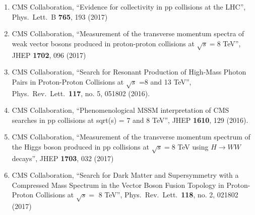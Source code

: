\begin{itemize}
\begin{enumerate}
\item CMS Collaboration, ``Evidence for collectivity in pp collisions at the LHC'', Phys.\ Lett.\ B {\bf 765}, 193 (2017)

\item CMS Collaboration, ``Measurement of the transverse momentum spectra of weak vector bosons produced in proton-proton collisions at $ \sqrt{s}=8 $ TeV'', JHEP {\bf 1702}, 096 (2017)

\item CMS Collaboration, ``Search for Resonant Production of High-Mass Photon Pairs in Proton-Proton Collisions at $\sqrt s$ =8 and 13 TeV'', Phys.\ Rev.\ Lett.\  {\bf 117}, no. 5, 051802 (2016).

\item CMS Collaboration, ``Phenomenological MSSM interpretation of CMS searches in pp collisions at sqrt(s) = 7 and 8 TeV'', JHEP {\bf 1610}, 129 (2016).

\item CMS Collaboration, ``Measurement of the transverse momentum spectrum of the Higgs boson produced in pp collisions at $ \sqrt{s}=8 $ TeV using $H \to WW$ decays'', JHEP {\bf 1703}, 032 (2017)

\item CMS Collaboration, ``Search for Dark Matter and Supersymmetry with a Compressed Mass Spectrum in the Vector Boson Fusion Topology in Proton-Proton Collisions at $\sqrt{s} =$ 8 TeV'', Phys.\ Rev.\ Lett.\  {\bf 118}, no. 2, 021802 (2017)


\end{enumerate}
\end{itemize}
